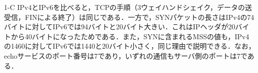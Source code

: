 \begin{maintask}{1-C}
  IPv4とIPv6を比べると，TCPの手順（3ウェイハンドシェイク，データの送受信，FINによる終了）は同じである．一方で，SYNパケットの長さはIPv4の74バイトに対してIPv6では94バイトと20バイト大きい．これはIPヘッダが20バイトから40バイトになったためである．また，SYNに含まれるMSSの値も，IPv4の1460に対してIPv6では1440と20バイト小さく，同じ理由で説明できる．なお，echoサービスのポート番号は7であり，いずれの通信もサーバ側のポートは7である．
\end{maintask}
